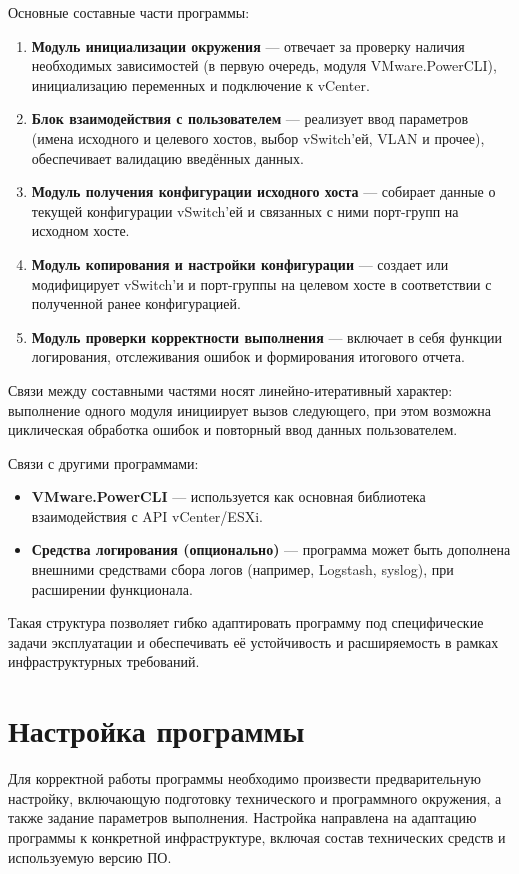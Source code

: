 Основные составные части программы:
\begin{enumerate}
  \item \textbf{Модуль инициализации окружения} — отвечает за проверку наличия необходимых зависимостей (в первую очередь, модуля VMware.PowerCLI), инициализацию переменных и подключение к vCenter.
  \item \textbf{Блок взаимодействия с пользователем} — реализует ввод параметров (имена исходного и целевого хостов, выбор vSwitch'ей, VLAN и прочее), обеспечивает валидацию введённых данных.
  \item \textbf{Модуль получения конфигурации исходного хоста} — собирает данные о текущей конфигурации vSwitch'ей и связанных с ними порт-групп на исходном хосте.
  \item \textbf{Модуль копирования и настройки конфигурации} — создает или модифицирует vSwitch'и и порт-группы на целевом хосте в соответствии с полученной ранее конфигурацией.
  \item \textbf{Модуль проверки корректности выполнения} — включает в себя функции логирования, отслеживания ошибок и формирования итогового отчета.
\end{enumerate}

Связи между составными частями носят линейно-итеративный характер: выполнение одного модуля инициирует вызов следующего, при этом возможна циклическая обработка ошибок и повторный ввод данных пользователем.

Связи с другими программами:
\begin{itemize}
  \item \textbf{VMware.PowerCLI} — используется как основная библиотека взаимодействия с API vCenter/ESXi.
  \item \textbf{Средства логирования (опционально)} — программа может быть дополнена внешними средствами сбора логов (например, Logstash, syslog), при расширении функционала.
\end{itemize}

Такая структура позволяет гибко адаптировать программу под специфические задачи эксплуатации и обеспечивать её устойчивость и расширяемость в рамках инфраструктурных требований.

\newpage
\section{Настройка программы}

Для корректной работы программы необходимо произвести предварительную настройку, включающую подготовку технического и программного окружения, а также задание параметров выполнения. Настройка направлена на адаптацию программы к конкретной инфраструктуре, включая состав технических средств и используемую версию ПО.

